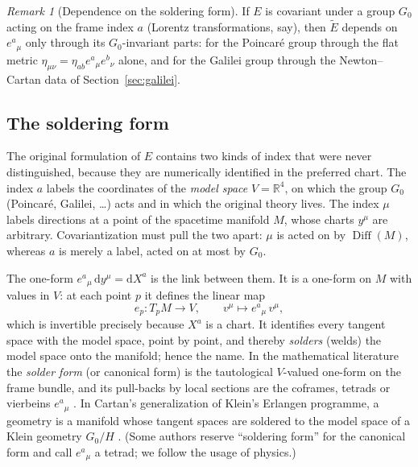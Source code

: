 \documentclass[11pt,a4paper,openany]{book}
\theoremstyle{definition}
\theoremstyle{plain}
\theoremstyle{remark}
\newtheorem{remark}{Remark}[chapter]
\newcommand{\dd}{\mathrm{d}}
\DeclareMathOperator{\Diff}{Diff}
\begin{document}
\begin{remark}[Dependence on the soldering form]\label{rem:soldering-dep}
If $E$ is covariant under a group $G_0$ acting on the frame index $a$ (Lorentz
transformations, say), then $\tilde E$ depends on $e^a{}_\mu$ only through its
$G_0$-invariant parts: for the Poincar\'e group through the flat metric
$\eta_{\mu\nu}=\eta_{ab}e^a{}_\mu e^b{}_\nu$ alone, and for the Galilei group
through the Newton--Cartan data of Section~\ref{sec:galilei}.
\end{remark}

\subsection{The soldering form}
\label{sec:soldering}

The original formulation of $E$ contains two kinds of index that were never
distinguished, because they are numerically identified in the preferred chart.
The index $a$ labels the coordinates of the \emph{model space} $V=\mathbb R^4$,
on which the group $G_0$ (Poincar\'e, Galilei, \dots) acts and in which the
original theory lives. The index $\mu$ labels directions at a point of the
spacetime manifold $M$, whose charts $y^\mu$ are arbitrary. Covariantization
must pull the two apart: $\mu$ is acted on by $\Diff(M)$, whereas $a$ is merely
a label, acted on at most by $G_0$.

The one-form $e^a{}_\mu\,\dd y^\mu=\dd X^a$ is the link between them. It is a
one-form on $M$ with values in $V$: at each point $p$ it defines the linear map
\begin{equation}
  e_p\colon T_pM\to V,\qquad v^\mu\mapsto e^a{}_\mu\,v^\mu ,
\end{equation}
which is invertible precisely because $X^a$ is a chart. It identifies every
tangent space with the model space, point by point, and thereby \emph{solders}
(welds) the model space onto the manifold; hence the name. In the mathematical
literature the \emph{solder form} (or canonical form) is the tautological
$V$-valued one-form on the frame bundle, and its pull-backs by local sections
are the coframes, tetrads or vierbeins $e^a{}_\mu$ \cite{kn}. In Cartan's
generalization of Klein's Erlangen programme, a geometry is a manifold whose
tangent spaces are soldered to the model space of a Klein geometry $G_0/H$
\cite{sharpe}. (Some authors reserve ``soldering form'' for the canonical
form and call $e^a{}_\mu$ a tetrad; we follow the usage of physics.)
\end{document}
